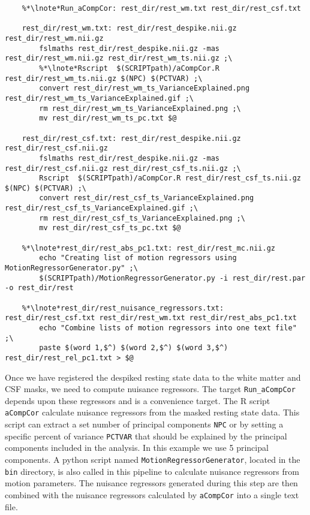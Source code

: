 \begin{lstlisting}
	%*\lnote*Run_aCompCor: rest_dir/rest_wm.txt rest_dir/rest_csf.txt

	rest_dir/rest_wm.txt: rest_dir/rest_despike.nii.gz rest_dir/rest_wm.nii.gz
		fslmaths rest_dir/rest_despike.nii.gz -mas rest_dir/rest_wm.nii.gz rest_dir/rest_wm_ts.nii.gz ;\
		%*\lnote*Rscript  $(SCRIPTpath)/aCompCor.R rest_dir/rest_wm_ts.nii.gz $(NPC) $(PCTVAR) ;\
		convert rest_dir/rest_wm_ts_VarianceExplained.png rest_dir/rest_wm_ts_VarianceExplained.gif ;\
		rm rest_dir/rest_wm_ts_VarianceExplained.png ;\
		mv rest_dir/rest_wm_ts_pc.txt $@

	rest_dir/rest_csf.txt: rest_dir/rest_despike.nii.gz rest_dir/rest_csf.nii.gz
		fslmaths rest_dir/rest_despike.nii.gz -mas rest_dir/rest_csf.nii.gz rest_dir/rest_csf_ts.nii.gz ;\
		Rscript  $(SCRIPTpath)/aCompCor.R rest_dir/rest_csf_ts.nii.gz $(NPC) $(PCTVAR) ;\
		convert rest_dir/rest_csf_ts_VarianceExplained.png rest_dir/rest_csf_ts_VarianceExplained.gif ;\
		rm rest_dir/rest_csf_ts_VarianceExplained.png ;\
		mv rest_dir/rest_csf_ts_pc.txt $@
		
	%*\lnote*rest_dir/rest_abs_pc1.txt: rest_dir/rest_mc.nii.gz
		echo "Creating list of motion regressors using MotionRegressorGenerator.py" ;\
		$(SCRIPTpath)/MotionRegressorGenerator.py -i rest_dir/rest.par -o rest_dir/rest
		
	%*\lnote*rest_dir/rest_nuisance_regressors.txt: rest_dir/rest_csf.txt rest_dir/rest_wm.txt rest_dir/rest_abs_pc1.txt
		echo "Combine lists of motion regressors into one text file" ;\
		paste $(word 1,$^) $(word 2,$^) $(word 3,$^) rest_dir/rest_rel_pc1.txt > $@
\end{lstlisting}

Once we have registered the despiked resting state data to the white matter and CSF masks, we need to compute nuisance regressors.  The target \texttt{Run_aCompCor} depends upon these regressors and is a convenience target.  The R script \texttt{aCompCor} calculate nuisance regressors from the masked resting state data. This script can extract a set number of principal components \texttt{NPC} or by setting a specific percent of variance \texttt{PCTVAR} that should be explained by the principal components included in the analysis. In this example we use 5 principal components. 
 \lnum{19}  A python script named \texttt{MotionRegressorGenerator}, located in the \texttt{bin} directory, is also called in this pipeline to calculate nuisance regressors from motion parameters.  The nuisance regressors generated during this step are then combined with the nuisance regressors calculated by \texttt{aCompCor} into a single text file. 


